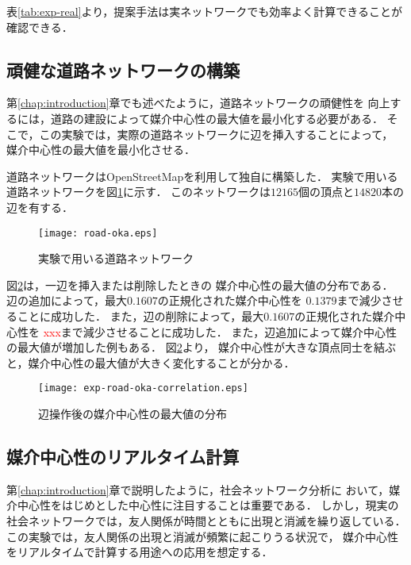 

表\ref{tab:exp-real}より，提案手法は実ネットワークでも効率よく計算できることが確認できる．

\subsection{頑健な道路ネットワークの構築}
\label{subsect:exp-road}

第\ref{chap:introduction}章でも述べたように，道路ネットワークの頑健性を
向上するには，道路の建設によって媒介中心性の最大値を最小化する必要がある．
そこで，この実験では，実際の道路ネットワークに辺を挿入することによって，
媒介中心性の最大値を最小化させる．

道路ネットワークはOpenStreetMap\cite{OpenStreetMap}を利用して独自に構築した．
実験で用いる道路ネットワークを図\ref{fig:road-okayama}に示す．
このネットワークは$12165$個の頂点と$14820$本の辺を有する．

\begin{figure}[tb]
  \centering
  \texttt{[image: road-oka.eps]}
  \caption{実験で用いる道路ネットワーク}
  \label{fig:road-okayama}
\end{figure}

図\ref{fig:exp-road-oka-correlation}は，一辺を挿入または削除したときの
媒介中心性の最大値の分布である．
辺の追加によって，最大$0.1607$の正規化された媒介中心性を
$0.1379$まで減少させることに成功した．
また，辺の削除によって，最大$0.1607$の正規化された媒介中心性を
\textcolor{red}{xxx}まで減少させることに成功した．
また，辺追加によって媒介中心性の最大値が増加した例もある．
図\ref{fig:exp-road-oka-correlation}より，
媒介中心性が大きな頂点同士を結ぶと，媒介中心性の最大値が大きく変化することが分かる．

\begin{figure}[tb]
  \centering
  \texttt{[image: exp-road-oka-correlation.eps]}
  \caption{辺操作後の媒介中心性の最大値の分布}
  \label{fig:exp-road-oka-correlation}
\end{figure}

\subsection{媒介中心性のリアルタイム計算}
\label{subsect:exp-sfhh}

第\ref{chap:introduction}章で説明したように，社会ネットワーク分析に
おいて，媒介中心性をはじめとした中心性に注目することは重要である．
しかし，現実の社会ネットワークでは，友人関係が時間とともに出現と消滅を繰り返している．
この実験では，友人関係の出現と消滅が頻繁に起こりうる状況で，
媒介中心性をリアルタイムで計算する用途への応用を想定する．

